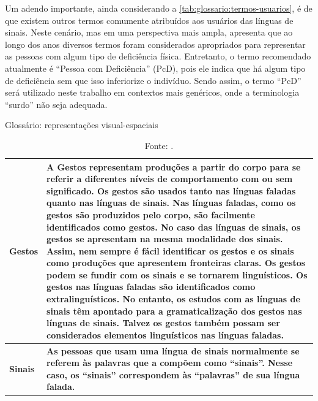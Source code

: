 Um adendo importante, ainda considerando a \autoref{tab:glossario:termos-usuarios}, é de que existem outros termos comumente atribuídos aos usuários das línguas de sinais. Neste cenário, mas em uma perspectiva mais ampla,  apresenta que ao longo dos anos diversos termos foram considerados apropriados para representar as pessoas com algum tipo de deficiência física. Entretanto, o termo recomendado atualmente é ``Pessoa com Deficiência'' (PcD), pois ele indica que há algum tipo de deficiência sem que isso inferiorize o indivíduo. Sendo assim, o termo ``PcD'' será utilizado neste trabalho em contextos mais genéricos, onde a terminologia ``surdo'' não seja adequada.

\begin{table}[htbp]
\caption{Glossário: representações visual-espaciais}
\label{tab:glossario:representacoes-visual-espaciais}
\begin{tabularx}{\textwidth}{l|X} \hline
\textbf{Gestos} & \textbf{A Gestos representam produções a partir do corpo para se referir a diferentes níveis de comportamento com ou sem significado. Os gestos são usados tanto nas línguas faladas quanto nas línguas de sinais. Nas línguas faladas, como os gestos são produzidos pelo corpo, são facilmente identificados como gestos. No caso das línguas de sinais, os gestos se apresentam na mesma modalidade dos sinais. Assim, nem sempre é fácil identificar os gestos e os sinais como produções que apresentem fronteiras claras. Os gestos podem se fundir com os sinais e se tornarem linguísticos. Os gestos nas línguas faladas são identificados como extralinguísticos. No entanto, os estudos com as línguas de sinais têm apontado para a gramaticalização dos gestos nas línguas de sinais. Talvez os gestos também possam ser considerados elementos linguísticos nas línguas faladas.} \\ \hline
\textbf{Sinais} & \textbf{As pessoas que usam uma língua de sinais normalmente se referem às palavras que a compõem como ``sinais''. Nesse caso, os ``sinais'' correspondem às ``palavras'' de sua língua falada.} \\ \hline
\end{tabularx}
\caption*{Fonte: .}
\end{table}

